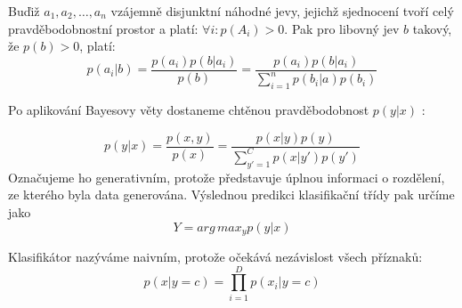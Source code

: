     \begin{definition}
        Buďiž $a_1, a_2, \hdots, a_n$ vzájemně disjunktní náhodné jevy, jejichž sjednocení tvoří celý pravděbodobnostní prostor a platí: $\forall i : p(A_i) > 0 $. Pak pro libovný jev $b$ takový, že $p(b) > 0$, platí: 
        $$p(a_i|b) = \frac{p(a_i)p(b|a_i)}{p(b)} = \frac{p(a_i)p(b|a_i)}{\sum_{i=1}^{n}p(b_i|a)p(b_i)}$$
        \end{definition}

Po aplikování Bayesovy věty dostaneme chtěnou pravděbodobnost $p(y|x)$ \cite{naiveBayes}:

$$p(y|x) = \frac{p(x,y)}{p(x)} = \frac{p(x|y)p(y)}{\sum_{y' = 1}^{C}p(x|y')p(y')}$$
Označujeme ho generativním, protože představuje úplnou informaci o rozdělení, ze kterého byla data generována. Výslednou predikci klasifikační třídy pak určíme jako 
$$ Y = arg\,max_y p(y|x)$$

Klasifikátor nazýváme naivním, protože očekává nezávislost všech příznaků:
$$ p(x|y = c) = \prod_{i=1}^{D}p(x_i|y = c)$$
\cite[překlad vlastní]{naiveBayes}

